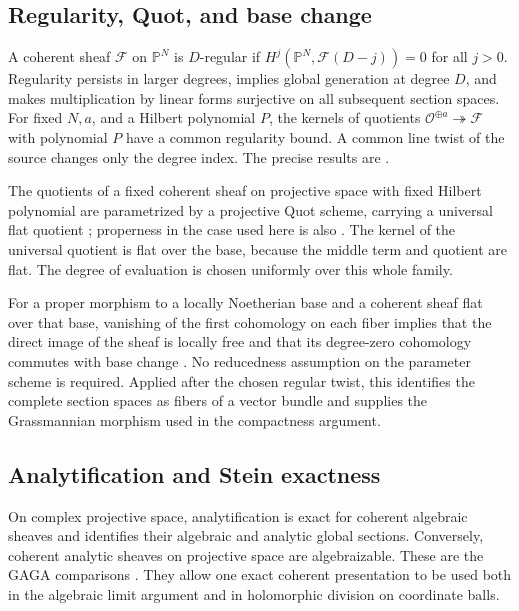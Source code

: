 \documentclass[11pt,reqno]{amsart}
\numberwithin{equation}{section}
\theoremstyle{definition}
\theoremstyle{remark}
\newcommand{\Pj}{\mathbb P}
\newcommand{\cO}{\mathcal O}
\begin{document}
\subsection{Regularity, Quot, and base change}
A coherent sheaf $\mathcal F$ on $\Pj^N$ is $D$-regular if
$H^j(\Pj^N,\mathcal F(D-j))=0$ for all $j>0$.
Regularity persists in larger degrees, implies global generation at
degree $D$, and makes multiplication by linear forms surjective on
all subsequent section spaces.  For fixed $N,a$, and a Hilbert
polynomial $P$, the kernels of quotients
$\cO^{\oplus a}\twoheadrightarrow\mathcal F$ with polynomial $P$
have a common regularity bound.  A common line twist of the source
changes only the degree index.  The precise results are
\cite[Tags 08A6--08A8 and 08AG]{StacksRegularity}.

The quotients of a fixed coherent sheaf on projective space with
fixed Hilbert polynomial are parametrized by a projective Quot
scheme, carrying a universal flat quotient
\cite[Theorem~3.2]{GrothendieckHilbert}; properness in the case used
here is also \cite[Tag 0DPA]{StacksQuot}.  The kernel of the universal
quotient is flat over the base, because the middle term and quotient
are flat.  The degree of evaluation is chosen uniformly over this
whole family.

For a proper morphism to a locally Noetherian base and a coherent
sheaf flat over that base, vanishing of the first cohomology on each
fiber implies that the direct image of the sheaf is locally free
and that its degree-zero cohomology commutes with base change
\cite[Theorem~1.1 and Corollary~1.2]{ConradBaseChange}.
No reducedness assumption on the parameter scheme is required.
Applied after the chosen regular twist, this identifies the
complete section spaces as fibers of a vector bundle and supplies
the Grassmannian morphism used in the compactness argument.

\subsection{Analytification and Stein exactness}
On complex projective space, analytification is exact for coherent
algebraic sheaves and identifies their algebraic and analytic global
sections.  Conversely, coherent analytic sheaves on projective space
are algebraizable.  These are the GAGA comparisons
\cite[Proposition~10 and Theorems~1--3]{SerreGAGA}.
They allow one exact coherent presentation to be used both in the
algebraic limit argument and in holomorphic division on coordinate
balls.
\end{document}
